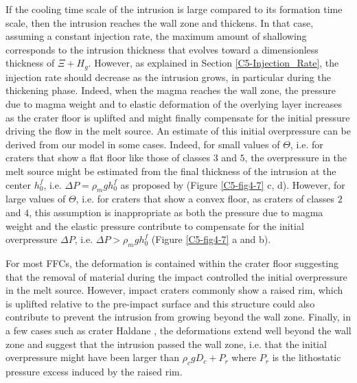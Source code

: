 If the  cooling time scale of  the intrusion is large  compared to its
formation time  scale, then  the intrusion reaches  the wall  zone and
thickens.   In that  case,  assuming a  constant  injection rate,  the
maximum amount  of shallowing  corresponds to the  intrusion thickness
that  evolves  toward  a  dimensionless  thickness  of  $\Xi  +  H_g$.
However,   as  explained   in  Section   \ref{C5-Injection_Rate},  the
injection rate should  decrease as the intrusion  grows, in particular
during the thickening phase.  Indeed,  when the magma reaches the wall
zone, the pressure  due to magma weight and to  elastic deformation of
the  overlying layer  increases as  the crater  floor is  uplifted and
might finally compensate for the  initial pressure driving the flow in
the  melt source.   An estimate  of this  initial overpressure  can be
derived from  our model in  some cases.   Indeed, for small  values of
$\Theta$,  i.e. for  craters  that show  a flat  floor  like those  of
classes $3$  and $5$,  the overpressure  in the  melt source  might be
estimated  from the  final thickness  of the  intrusion at  the center
$h_0^f$,   i.e.    $\Delta    P=\rho_{m}gh_{0}^f$   as   proposed   by
\citet{Jozwiak:2012dq}  (Figure \ref{C5-fig4-7}  c,  d). However,  for
large values of $\Theta$, i.e.  for  craters that show a convex floor,
as craters of classes $2$ and $4$, this assumption is inappropriate as
both  the  pressure due  to  magma  weight  and the  elastic  pressure
contribute to compensate for the initial overpressure $\Delta P$, i.e.
$\Delta P> \rho_m gh_0^f$ (Figure \ref{C5-fig4-7} a and b).
	
For most  FFCs, the deformation  is contained within the  crater floor
\citep{Schultz:1976kt} suggesting that the  removal of material during
the impact  controlled the  initial overpressure  in the  melt source.
However, impact craters commonly show  a raised rim, which is uplifted
relative  to the  pre-impact  surface and  this  structure could  also
contribute to prevent the intrusion from growing beyond the wall zone.
Finally, in a few cases such as crater Haldane \citep{Schultz:1976kt},
the deformations extend well beyond the wall zone and suggest that the
intrusion passed  the wall zone,  i.e.  that the  initial overpressure
might have  been larger than  $\rho_c g D_c  +P_r$ where $P_r$  is the
lithostatic pressure excess induced by the raised rim.
		

